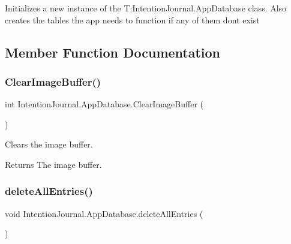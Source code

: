 Initializes a new instance of the T\+:\+Intention\+Journal.\+App\+Database class. Also creates the tables the app needs to function if any of them don\textquotesingle{}t exist 



\subsection{Member Function Documentation}
\mbox{\label{class_intention_journal_1_1_app_database_a4e859f5d31d6c889307543f919afa9bd}} 
\subsubsection{\texorpdfstring{Clear\+Image\+Buffer()}{ClearImageBuffer()}}
{\footnotesize\ttfamily int Intention\+Journal.\+App\+Database.\+Clear\+Image\+Buffer (\begin{DoxyParamCaption}{ }\end{DoxyParamCaption})\hspace{0.3cm}{\ttfamily [inline]}}



Clears the image buffer. 

\begin{DoxyReturn}{Returns}
The image buffer.
\end{DoxyReturn}
\mbox{\label{class_intention_journal_1_1_app_database_a090f896fa5b8ffc96273462294202950}} 
\subsubsection{\texorpdfstring{delete\+All\+Entries()}{deleteAllEntries()}}
{\footnotesize\ttfamily void Intention\+Journal.\+App\+Database.\+delete\+All\+Entries (\begin{DoxyParamCaption}{ }\end{DoxyParamCaption})\hspace{0.3cm}{\ttfamily [inline]}}



